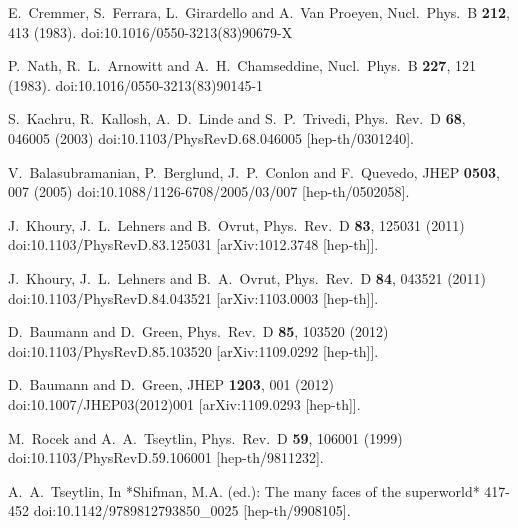 \documentclass[12pt]{article}
\begin{document}
\begin{thebibliography}{99}
  E.~Cremmer, S.~Ferrara, L.~Girardello and A.~Van Proeyen,
  Nucl.\ Phys.\ B {\bf 212}, 413 (1983).
  doi:10.1016/0550-3213(83)90679-X

  P.~Nath, R.~L.~Arnowitt and A.~H.~Chamseddine,
  Nucl.\ Phys.\ B {\bf 227}, 121 (1983).
  doi:10.1016/0550-3213(83)90145-1

  S.~Kachru, R.~Kallosh, A.~D.~Linde and S.~P.~Trivedi,
  Phys.\ Rev.\ D {\bf 68}, 046005 (2003)
  doi:10.1103/PhysRevD.68.046005
  [hep-th/0301240].

  V.~Balasubramanian, P.~Berglund, J.~P.~Conlon and F.~Quevedo,
  JHEP {\bf 0503}, 007 (2005)
  doi:10.1088/1126-6708/2005/03/007
  [hep-th/0502058].

  J.~Khoury, J.~L.~Lehners and B.~Ovrut,
  Phys.\ Rev.\ D {\bf 83}, 125031 (2011)
  doi:10.1103/PhysRevD.83.125031
  [arXiv:1012.3748 [hep-th]].

  J.~Khoury, J.~L.~Lehners and B.~A.~Ovrut,
  Phys.\ Rev.\ D {\bf 84}, 043521 (2011)
  doi:10.1103/PhysRevD.84.043521
  [arXiv:1103.0003 [hep-th]].

  D.~Baumann and D.~Green,
  Phys.\ Rev.\ D {\bf 85}, 103520 (2012)
  doi:10.1103/PhysRevD.85.103520
  [arXiv:1109.0292 [hep-th]].

  D.~Baumann and D.~Green,
  JHEP {\bf 1203}, 001 (2012)
  doi:10.1007/JHEP03(2012)001
  [arXiv:1109.0293 [hep-th]].

  M.~Rocek and A.~A.~Tseytlin,
  Phys.\ Rev.\ D {\bf 59}, 106001 (1999)
  doi:10.1103/PhysRevD.59.106001
  [hep-th/9811232].

  A.~A.~Tseytlin,
  In *Shifman, M.A. (ed.): The many faces of the superworld* 417-452
  doi:10.1142/9789812793850\_0025
  [hep-th/9908105].


\end{thebibliography}
\end{document}

